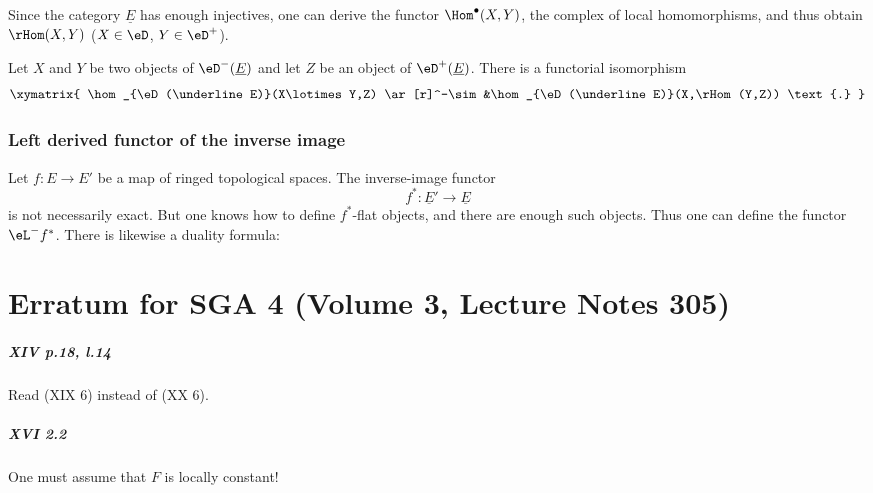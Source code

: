 Since the category $\underline E$ has enough injectives, one can derive
the functor $\Hom^\bullet(X,Y)$, the complex of local homomorphisms, and
thus obtain $\rHom(X,Y)$ ($X\in \eD$, $Y\in \eD^+$).

Let $X$ and $Y$ be two objects of $\eD^-(\underline E)$ and let $Z$ be an object
of $\eD^+(\underline E)$. There is a functorial isomorphism
\[\xymatrix{
  \hom_{\eD(\underline E)}(X\lotimes Y,Z) \ar[r]^-\sim
    &\hom_{\eD(\underline E)}(X,\rHom(Y,Z)) \text{.}
}\]

\subsection{Left derived functor of the inverse image}\label{VIII:6-3}

Let $f:E\to E'$ be a map of ringed topological spaces. The inverse-image
functor
\[
  f^\ast:\underline{E}' \to \underline E
\]
is not necessarily exact. But one knows how to define $f^\ast$-flat
objects, and there are enough such objects. Thus one can define the
functor $\eL^- f^\ast$. There is likewise a duality formula:




\appendix
\chapter{Erratum for SGA 4 (Volume 3, Lecture Notes 305)}\label{ErratumSGA4}

\paragraph{XIV p.18, l.14}
Read (XIX 6) instead of (XX 6).

\paragraph{XVI 2.2}
One must assume that $F$ is locally constant!

